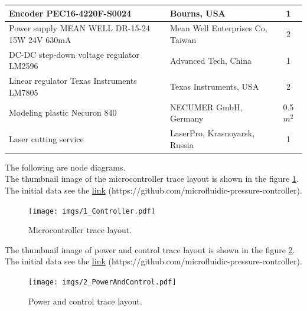 \documentclass[twoside, 12pt, a4paper]{refart}
\begin{document}
\begin{tabular} { | p{6.5cm} | p{4.4cm} | p{0.7cm} | }
      Encoder PEC16-4220F-S0024 & Bourns, USA & \multicolumn{1}{c|}{1} \\ \hline          
      Power supply MEAN WELL DR-15-24 15W 24V 630mA & Mean Well Enterprises Co, Taiwan & \multicolumn{1}{c|}{2} \\ \hline          
      DC-DC step-down voltage regulator LM2596 & Advanced Tech, China & \multicolumn{1}{c|}{1} \\ \hline          
      Linear regulator Texas Instruments LM7805 & Texas Instruments, USA & \multicolumn{1}{c|}{2} \\ \hline          
      Modeling plastic Necuron 840 & NECUMER GmbH, Germany & \multicolumn{1}{c|}{0.5 $m^2$} \\ \hline  
      Laser cutting service & LaserPro, Krasnoyarsk, Russia & \multicolumn{1}{c|}{1} \\ \hline
    \end{tabular}
    
   \newpage    
    The following are node diagrams.\\ 
    The thumbnail image of the microcontroller trace layout is shown in the figure \ref{fig:1Controller}.\\
    The initial data see the \href{https://github.com/microfluidic-pressure-controller}{link} (https://github.com/microfluidic-pressure-controller).\\
    \begin{figure}[H]
	  \begin{center}
	  \texttt{[image: imgs/1\_Controller.pdf]}
	  \caption{Microcontroller trace layout.}
	  \label{fig:1Controller}
	  \end{center}
    \end{figure}
   
   
    The thumbnail image of power and control trace layout is shown in the figure \ref{fig:2PowerAndControl}.\\
    The initial data see the \href{https://github.com/microfluidic-pressure-controller}{link} (https://github.com/microfluidic-pressure-controller).\\
    \begin{figure}[H]
	  \begin{center}
	  \texttt{[image: imgs/2\_PowerAndControl.pdf]}
	  \caption{Power and control trace layout.}
	  \label{fig:2PowerAndControl}
	  \end{center}
    \end{figure}
    
\end{document}
